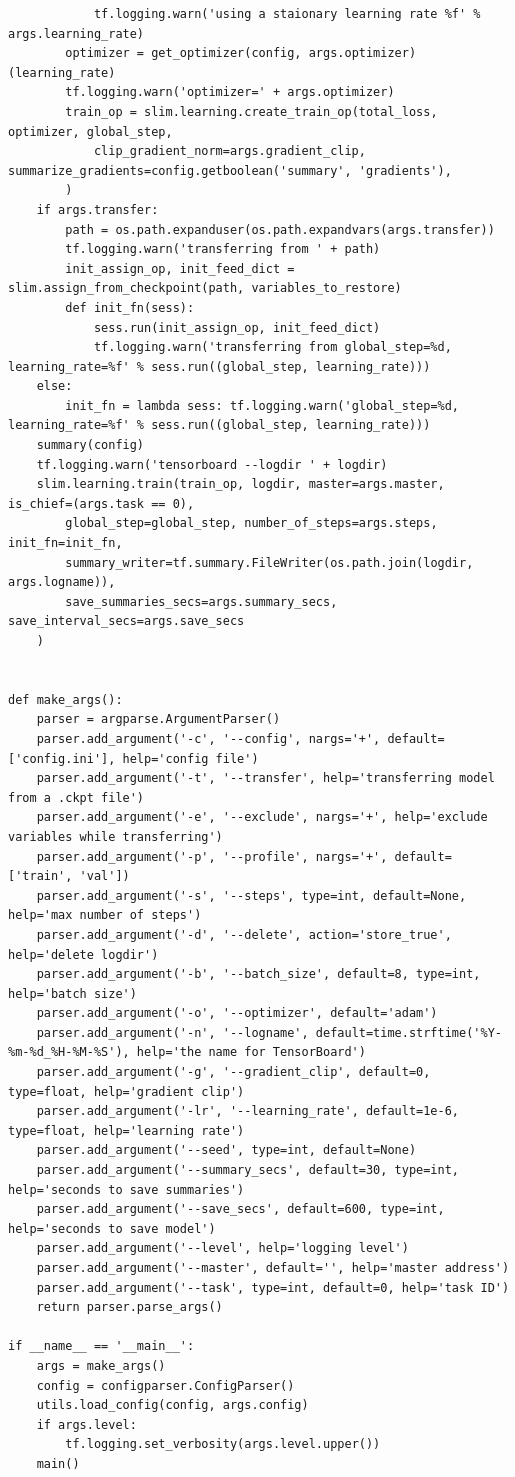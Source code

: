 \begin{lstlisting}
            tf.logging.warn('using a staionary learning rate %f' % args.learning_rate)
        optimizer = get_optimizer(config, args.optimizer)(learning_rate)
        tf.logging.warn('optimizer=' + args.optimizer)
        train_op = slim.learning.create_train_op(total_loss, optimizer, global_step,
            clip_gradient_norm=args.gradient_clip, summarize_gradients=config.getboolean('summary', 'gradients'),
        )
    if args.transfer:
        path = os.path.expanduser(os.path.expandvars(args.transfer))
        tf.logging.warn('transferring from ' + path)
        init_assign_op, init_feed_dict = slim.assign_from_checkpoint(path, variables_to_restore)
        def init_fn(sess):
            sess.run(init_assign_op, init_feed_dict)
            tf.logging.warn('transferring from global_step=%d, learning_rate=%f' % sess.run((global_step, learning_rate)))
    else:
        init_fn = lambda sess: tf.logging.warn('global_step=%d, learning_rate=%f' % sess.run((global_step, learning_rate)))
    summary(config)
    tf.logging.warn('tensorboard --logdir ' + logdir)
    slim.learning.train(train_op, logdir, master=args.master, is_chief=(args.task == 0),
        global_step=global_step, number_of_steps=args.steps, init_fn=init_fn,
        summary_writer=tf.summary.FileWriter(os.path.join(logdir, args.logname)),
        save_summaries_secs=args.summary_secs, save_interval_secs=args.save_secs
    )


def make_args():
    parser = argparse.ArgumentParser()
    parser.add_argument('-c', '--config', nargs='+', default=['config.ini'], help='config file')
    parser.add_argument('-t', '--transfer', help='transferring model from a .ckpt file')
    parser.add_argument('-e', '--exclude', nargs='+', help='exclude variables while transferring')
    parser.add_argument('-p', '--profile', nargs='+', default=['train', 'val'])
    parser.add_argument('-s', '--steps', type=int, default=None, help='max number of steps')
    parser.add_argument('-d', '--delete', action='store_true', help='delete logdir')
    parser.add_argument('-b', '--batch_size', default=8, type=int, help='batch size')
    parser.add_argument('-o', '--optimizer', default='adam')
    parser.add_argument('-n', '--logname', default=time.strftime('%Y-%m-%d_%H-%M-%S'), help='the name for TensorBoard')
    parser.add_argument('-g', '--gradient_clip', default=0, type=float, help='gradient clip')
    parser.add_argument('-lr', '--learning_rate', default=1e-6, type=float, help='learning rate')
    parser.add_argument('--seed', type=int, default=None)
    parser.add_argument('--summary_secs', default=30, type=int, help='seconds to save summaries')
    parser.add_argument('--save_secs', default=600, type=int, help='seconds to save model')
    parser.add_argument('--level', help='logging level')
    parser.add_argument('--master', default='', help='master address')
    parser.add_argument('--task', type=int, default=0, help='task ID')
    return parser.parse_args()

if __name__ == '__main__':
    args = make_args()
    config = configparser.ConfigParser()
    utils.load_config(config, args.config)
    if args.level:
        tf.logging.set_verbosity(args.level.upper())
    main()
\end{lstlisting}

